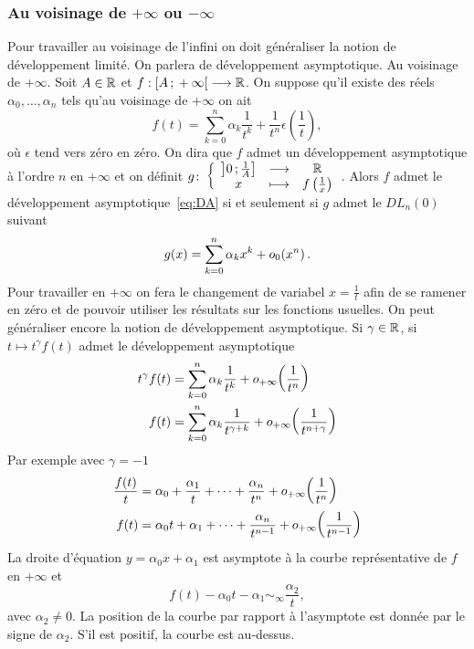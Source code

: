 \subsubsection{Au voisinage de \(+\infty\) ou \(-\infty\)}

Pour travailler au voisinage de l'infini on doit généraliser la notion de 
développement limité. On parlera de développement asymptotique. Au voisinage de 
\(+\infty\). Soit \(A \in \mathbb{R}\) et \(f:\left[ A \, ; {} +\infty \right[ \longrightarrow 
\mathbb{R}\). On suppose qu'il existe des réels \(\alpha_0, \ldots, \alpha_n\) tels 
qu'au voisinage de \(+\infty\) on ait
\begin{equation}
  \label{eq:DA}
  f(t) = \sum_{k=0}^n \alpha_k \frac{1}{t^k} + 
  \frac{1}{t^n}\epsilon\left(\frac{1}{t}\right),
\end{equation}
où \(\epsilon\) tend vers zéro en zéro. On dira que \(f\) admet un développement 
asymptotique à l'ordre \(n\) en \(+\infty\) et on définit 
\(g\colon\left\{\begin{array}{ccc}\left] 0 \, ; {} \frac{1}{A} \right] & \longrightarrow &\mathbb{R}\\x & \longmapsto & f\left(\frac{1}{x}\right)\end{array}\right.\). 
Alors \(f\) admet le développement asymptotique~\eqref{eq:DA} si et seulement si 
\(g\) admet le \(DL_n(0)\) suivant
\begin{equation}
  g(x)= \sum_{k=0}^n \alpha_k x^k + o\mathopen{}_{0}\left(x^n\right).
\end{equation}
Pour travailler en \(+\infty\) on fera le changement de variabel 
\(x=\frac{1}{t}\) afin de se ramener en zéro et de pouvoir utiliser les 
résultats sur les fonctions usuelles. On peut généraliser encore la notion de 
développement asymptotique. Si \(\gamma \in \mathbb{R}\), si \(t \longmapsto t^\gamma 
f(t)\) admet le développement asymptotique
\begin{align}
  t^\gamma f(t) &= \sum_{k=0}^n \alpha_k \frac{1}{t^k} + 
  o\mathopen{}_{+\infty}\left(\frac{1}{t^n}\right) \\
  f(t)&= \sum_{k=0}^n \alpha_k \frac{1}{t^{\gamma +k}} + 
  o\mathopen{}_{+\infty}\left(\frac{1}{t^{n+\gamma}}\right)
\end{align}
Par exemple avec \(\gamma=-1\)
\begin{align}
  \frac{f(t)}{t} &= \alpha_0 + \frac{\alpha_1}{t} + \dotsb + 
  \frac{\alpha_n}{t^n} + o\mathopen{}_{+\infty}\left(\frac{1}{t^n}\right) \\
  f(t) &= \alpha_0 t +\alpha_1 + \dotsb + \frac{\alpha_n}{t^{n-1}} + 
  o\mathopen{}_{+\infty}\left(\frac{1}{t^{n-1}}\right)
\end{align}
La droite d'équation \(y=\alpha_0 x +\alpha_1\) est asymptote à la courbe 
représentative de \(f\) en \(+\infty\) et
\begin{equation}
  f(t)-\alpha_0 t -\alpha_1 \sim_\infty \frac{\alpha_2}{t},
\end{equation}
avec \(\alpha_2 \neq 0\). La position de la courbe par rapport à l'asymptote est 
donnée par le signe de \(\alpha_2\). S'il est positif, la courbe est au-dessus.

